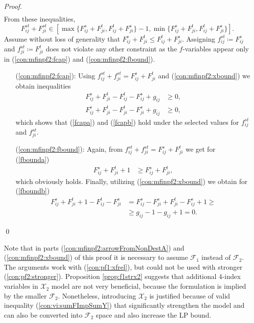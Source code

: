 \begin{proof}
\begin{subequations}
\begin{align}
\end{align}
\end{subequations}
From these inequalities,
$$
 F^{st}_{ij} +  F^{st}_{ji}\in\left[\max\{F^s_{ij}+F^t_{ji},F^t_{ij}+F^s_{ji}\}-1,\min\{F^s_{ij}+F^t_{ji},F^t_{ij}+F^s_{ji}\}\right].
$$
Assume without loss of generality that $F^s_{ij} + F^t_{ji}\leq F^t_{ij} + F^s_{ji}$. Assigning $ f^{st}_{ij}\coloneqq F^s_{ij}$ and $ f^{st}_{ji}\coloneqq F^t_{ji}$ does not violate any other constraint as the $ f$-variables appear only in (\ref{con:mfinpf2:fcap}) and (\ref{con:mfinpf2:fbound}).
\begin{itemize}[leftmargin=1cm]
\item[(\ref{con:mfinpf2:fcap}):]  Using $ f^{st}_{ij} +  f^{st}_{ji} = F^s_{ij} + F^{t}_{ji}$ and (\ref{con:mfinpf2:xbound}) we obtain inequalities
	\begin{align*}
	F^s_{ij} + F^{t}_{ji}-F^t_{ij}-F^s_{ij}+g_{ij}&\geq 0,\\
	F^s_{ij} + F^{t}_{ji}-F^t_{ji}-F^s_{ji}+g_{ij}&\geq 0,
	\end{align*}
	which shows that (\ref{fcapa}) and (\ref{fcapb}) hold under the selected values for $ f^{st}_{ij}$ and $ f^{st}_{ji}$.
\item[(\ref{con:mfinpf2:fbound}):] Again, from $ f^{st}_{ij} +  f^{st}_{ji} = F^s_{ij} + F^{t}_{ji}$  we get for (\ref{fbounda})
	\begin{align*}
	F^s_{ij} + F^{t}_{ji} + 1 &\geq F^s_{ij}+F^t_{ji},
	\end{align*}
	which obviously holds. Finally, utilizing (\ref{con:mfinpf2:xbound}) we obtain for (\ref{fboundb})
	\begin{align*}
	F^s_{ij} + F^{t}_{ji} + 1 -F^t_{ij}-F^s_{ji} &= F^s_{ij}-F^s_{ji}+F^t_{ji}-F^s_{ij}+1 \geq \\
	&\geq g_{ij}-1-g_{ij}+1=0.
	\end{align*}
\end{itemize}\qed
\end{proof} 
Note that in parts (\ref{con:mfinpf2:arrowFromNonDestA}) and (\ref{con:mfinpf2:xbound}) of this proof it is necessary to assume $\mathcal{F}_1$ instead of $\mathcal{F}_2$.
The arguments work with (\ref{con:pf1:xfrel}), but could not be used with stronger (\ref{con:pf2:stronger}).
Proposition \ref{prop:f1strx2} suggests that additional 4-index variables in $\mathcal{X}_2$ model are not very beneficial, because the formulation is implied by the smaller $\mathcal{F}_2$.
Nonetheless, introducing $\mathcal{X}_2$ is justified because of valid inequality (\ref{con:vi:sumFImpSumY}) that significantly strengthen the model and can also be converted into $\mathcal{F}_2$ space and also increase the LP bound.

